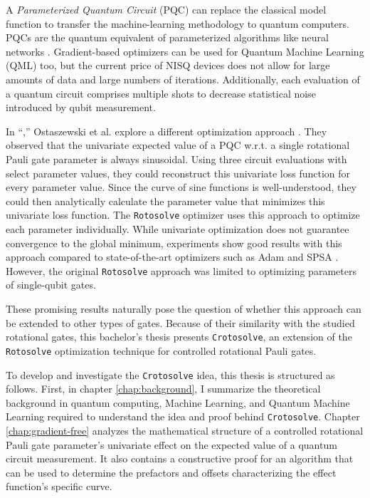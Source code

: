A \emph{Parameterized Quantum Circuit} (PQC) can replace the classical model
function to transfer the machine-learning methodology to quantum computers.
PQCs are the quantum equivalent of parameterized algorithms like neural
networks \cite{benedetti_parameterized_2019}.
Gradient-based optimizers can be used for Quantum Machine Learning (QML) too,
but the current price of NISQ devices does not allow for large amounts of data
and large numbers of iterations.
Additionally, each evaluation of a quantum circuit comprises multiple shots to
decrease statistical noise introduced by qubit measurement.

In ``\emph{},'' Ostaszewski et al.
explore a different optimization approach \cite{ostaszewski_structure_2021}.
They observed that the univariate expected value of a PQC w.r.t. a single
rotational Pauli gate parameter is always sinusoidal.
Using three circuit evaluations with select parameter values, they could
reconstruct this univariate loss function for every parameter value.
Since the curve of sine functions is well-understood, they could then
analytically calculate the parameter value that minimizes this univariate loss
function.
The \texttt{Rotosolve} optimizer uses this approach to optimize each parameter
individually.
While univariate optimization does not guarantee convergence to the global
minimum, experiments show good results with this approach compared to
state-of-the-art optimizers such as Adam and SPSA
\cite{kingma_adam_2017,spall_multivariate_1992,ostaszewski_structure_2021}.
However, the original \texttt{Rotosolve} approach was limited to optimizing
parameters of single-qubit gates.

These promising results naturally pose the question of whether this approach can
be extended to other types of gates.
Because of their similarity with the studied rotational gates, this bachelor's
thesis presents \texttt{Crotosolve}, an extension of the \texttt{Rotosolve}
optimization technique for controlled rotational Pauli gates.

To develop and investigate the \texttt{Crotosolve} idea, this thesis is
structured as follows.
First, in chapter \ref{chap:background}, I summarize the theoretical background
in quantum computing, Machine Learning, and Quantum Machine Learning required to
understand the idea and proof behind \texttt{Crotosolve}.
Chapter \ref{chap:gradient-free} analyzes the mathematical structure of a
controlled rotational Pauli gate parameter's univariate effect on the
expected value of a quantum circuit measurement.
It also contains a constructive proof for an algorithm that can be used to
determine the prefactors and offsets characterizing the effect function's
specific curve.

